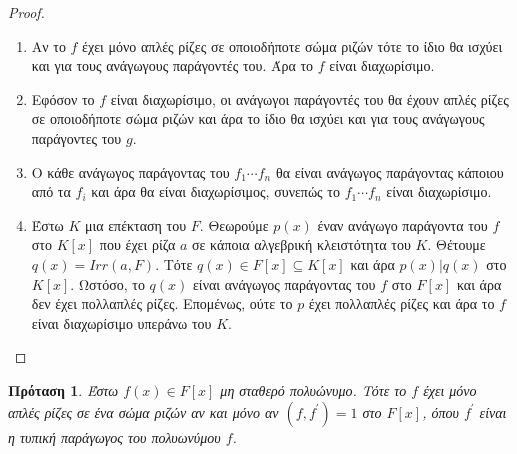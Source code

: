 \documentclass[oneside,a4paper]{article}
\newtheorem{prop}{Πρόταση}
\begin{document}
\begin{proof} $ $

	\begin{enumerate}
		\item Αν το $f$ έχει μόνο απλές ρίζες σε οποιοδήποτε σώμα ριζών τότε το ίδιο θα ισχύει και για τους ανάγωγους παράγοντές του. Άρα το $f$ είναι διαχωρίσιμο.
		\item Εφόσον το $f$ είναι διαχωρίσιμο, οι ανάγωγοι παράγοντές του θα έχουν απλές ρίζες σε οποιοδήποτε σώμα ριζών και άρα το ίδιο θα ισχύει και για τους ανάγωγους παράγοντες του $g$.
		\item Ο κάθε ανάγωγος παράγοντας του $f_1 \cdots f_n$ θα είναι ανάγωγος παράγοντας κάποιου από τα $f_i$ και άρα θα είναι διαχωρίσιμος, συνεπώς το $f_1 \cdots f_n$ είναι διαχωρίσιμο.
		\item Έστω $K$ μια επέκταση του $F$. Θεωρούμε $p(x)$ έναν ανάγωγο παράγοντα του $f$ στο $K[x]$ που έχει ρίζα $a$ σε κάποια αλγεβρική κλειστότητα του $K$. Θέτουμε $q(x) = Irr(a,F)$. Τότε $q(x) \in F[x] \subseteq K[x]$ και άρα $p(x)|q(x)$ στο $K[x]$. Ωστόσο, το $q(x)$ είναι ανάγωγος παράγοντας του $f$ στο $F[x]$ και άρα δεν έχει πολλαπλές ρίζες. Επομένως, ούτε το $p$ έχει πολλαπλές ρίζες και άρα το $f$ είναι διαχωρίσιμο υπεράνω του $K$.
	\end{enumerate}

\end{proof}

\vspace{0.1cm}
\begin{prop}Έστω $f(x) \in F[x]$ μη σταθερό πολυώνυμο. Τότε το $f$ έχει μόνο απλές ρίζες σε ένα σώμα ριζών αν και μόνο αν $(f,f^{\prime})=1$ στο $F[x]$, όπου $f^{\prime}$ είναι η τυπική παράγωγος του πολυωνύμου $f$.

\end{prop}
\end{document}
